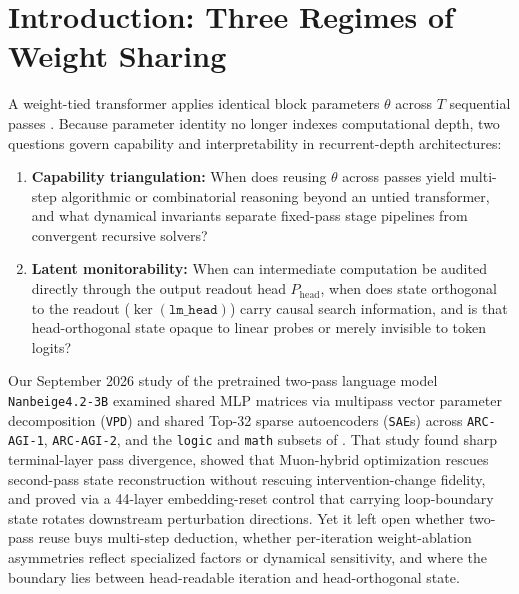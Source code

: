 \documentclass[10pt,letterpaper]{article}
\newcommand{\Phead}{P_{\mathrm{head}}}
\begin{document}
\section{Introduction: Three Regimes of Weight Sharing}\label{sec:intro}

A weight-tied transformer applies identical block parameters $\theta$ across $T$ sequential passes \cite{dehghani2019universal,giannou2023looped,saunshi2025latent,geiping2025huginn,wang2025hrm,jolicoeur2025trm,li2026deeploop}. Because parameter identity no longer indexes computational depth, two questions govern capability and interpretability in recurrent-depth architectures:
\begin{enumerate}[topsep=3pt,itemsep=2pt]
  \item \textbf{Capability triangulation:} When does reusing $\theta$ across passes yield multi-step algorithmic or combinatorial reasoning beyond an untied transformer, and what dynamical invariants separate fixed-pass stage pipelines from convergent recursive solvers?
  \item \textbf{Latent monitorability:} When can intermediate computation be audited directly through the output readout head $\Phead$, when does state orthogonal to the readout ($\ker(\texttt{lm\_head})$) carry causal search information, and is that head-orthogonal state opaque to linear probes or merely invisible to token logits?
\end{enumerate}

Our September 2026 study of the pretrained two-pass language model \texttt{Nanbeige4.2-3B} \cite{nanbeige2026model,dugan2026vpd} examined shared MLP matrices via multipass vector parameter decomposition (\texttt{VPD}) \cite{braun2025apd} and shared Top-32 sparse autoencoders (\texttt{SAE}s) \cite{bricken2023monosemanticity,gao2024scaling} across \texttt{ARC-AGI-1}, \texttt{ARC-AGI-2}, and the \texttt{logic} and \texttt{math} subsets of  \cite{primeintellect2025intellect3}. That study found sharp terminal-layer pass divergence, showed that Muon-hybrid optimization \cite{jordan2024muon,dugan2026muonsae} rescues second-pass state reconstruction without rescuing intervention-change fidelity, and proved via a 44-layer embedding-reset control that carrying loop-boundary state rotates downstream perturbation directions. Yet it left open whether two-pass reuse buys multi-step deduction, whether per-iteration weight-ablation asymmetries reflect specialized factors or dynamical sensitivity, and where the boundary lies between head-readable iteration and head-orthogonal state.
\end{document}
